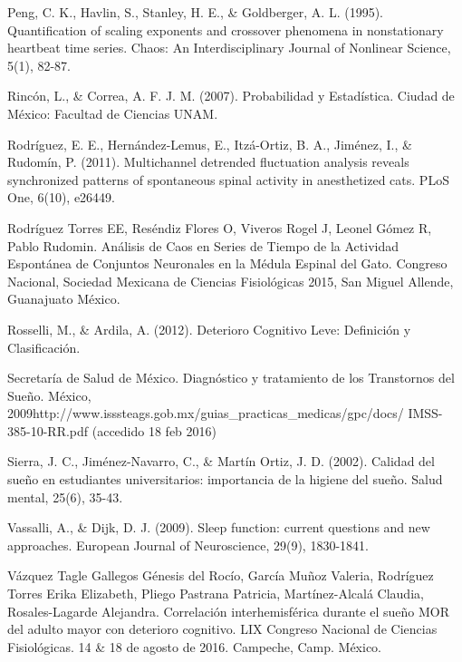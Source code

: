 \documentclass[letterpaper,titlepage,12pt,draft]{report}
\begin{document}
\begin{thebibliography}{10}
Peng, C. K., Havlin, S., Stanley, H. E., \& Goldberger, A. L. (1995). Quantification of scaling exponents and crossover phenomena in nonstationary heartbeat time series. Chaos: An Interdisciplinary Journal of Nonlinear Science, 5(1), 82-87.

Rinc\'on, L., \& Correa, A. F. J. M. (2007). Probabilidad y Estad\'istica. Ciudad de M\'exico: Facultad de Ciencias UNAM.

Rodr\'iguez, E. E., Hern\'andez-Lemus, E., Itz\'a-Ortiz, B. A., Jim\'enez, I., \& Rudom\'in, P. (2011). Multichannel detrended fluctuation analysis reveals synchronized patterns of spontaneous spinal activity in anesthetized cats. PLoS One, 6(10), e26449.

Rodr\'iguez Torres EE, Res\'endiz Flores O, Viveros Rogel J, Leonel G\'omez R, Pablo Rudomin. An\'alisis de Caos en Series de Tiempo de la Actividad Espont\'anea de Conjuntos Neuronales en la M\'edula Espinal del Gato. Congreso Nacional, Sociedad Mexicana de Ciencias Fisiol\'ogicas 2015, San Miguel Allende, Guanajuato M\'exico.

Rosselli, M., \& Ardila, A. (2012). Deterioro Cognitivo Leve: Definici\'on y Clasificaci\'on.

Secretar\'ia de Salud de M\'exico. Diagn\'ostico y tratamiento de los Transtornos del Sue\~no. M\'exico, 2009http://www.isssteags.gob.mx/guias\_practicas\_medicas/gpc/docs/
IMSS-385-10-RR.pdf (accedido 18 feb 2016) 

Sierra, J. C., Jim\'enez-Navarro, C., \& Mart\'in Ortiz, J. D. (2002). Calidad del sue\~no en estudiantes universitarios: importancia de la higiene del sue\~no. Salud mental, 25(6), 35-43.

Vassalli, A., \& Dijk, D. J. (2009). Sleep function: current questions and new approaches. European Journal of Neuroscience, 29(9), 1830-1841.

V\'azquez Tagle Gallegos G\'enesis del Roc\'io, Garc\'ia Mu\~noz Valeria, Rodr\'iguez Torres Erika Elizabeth, Pliego Pastrana Patricia, Mart\'inez-Alcal\'a Claudia, Rosales-Lagarde Alejandra. Correlaci\'on interhemisf\'erica durante el sue\~no MOR del adulto mayor con deterioro cognitivo. LIX Congreso Nacional de Ciencias Fisiol\'ogicas. 14 \& 18 de agosto de 2016. Campeche, Camp. M\'exico.

\end{thebibliography}
\end{document}
